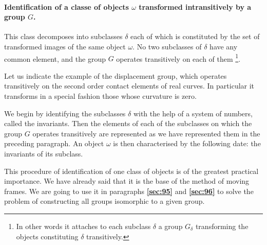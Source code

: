 \documentclass[leqno,11pt]{book}
\numberwithin{equation}{chapter}
\theoremstyle{shape1}
\theoremstyle{shapesmall}
\newcommand{\fsref}[1]{{\rm\textsection\textbf{\ref{sec:#1}}}}
\newcommand{\somespace}{\vspace{9pt}}
\begin{document}
\paragraph{Identification of a classe of objects $\omega$ transformed intransitively by a group $G$.}
\label{sec:94}
This class decomposes into subclasses $\delta$ each of which is constituted by the set of transformed images of the same object $\omega$. No two subclasses of $\delta$ have any common element, and the group $G$ operates transitively on each of them \footnote{In other words it attaches to each subclass $\delta$ a group $G_{\delta}$ transforming the objects constituting $\delta$ transitively.}.

\somespace
{\small Let us indicate the example of the displacement group, which operates transitively on the second order contact elements of real curves. In particular it transforms in a special fashion those whose curvature is zero.
}

\somespace

We begin by identifying the subclasses $\delta$ with the help of a system of numbers, called the invariants. Then the elements of each of the subclasses on which the group $G$ operates transitively are represented as we have represented them in the preceding paragraph. An object $\omega$ is then characterised by the following date: the invariants of its subclass.

This procedure of identification of one class of objects is of the greatest practical importance. We have already said that it is the base of the method of moving frames. We are going to use it in paragraphs \fsref{95} and \fsref{96} to solve the problem of constructing all groups isomorphic to a given group.
\end{document}
